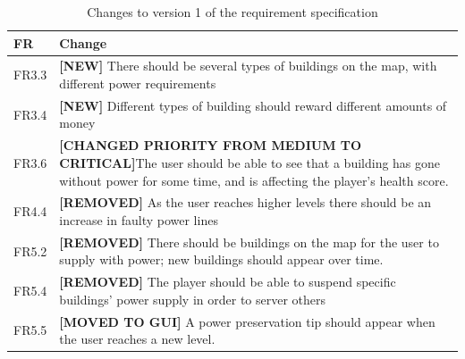 	\begin{table}[H]
	\begin{tabular}{| p{1.5cm} | p{12cm} |}
		\hline
		\rowcolor{lightgray}
		{\bf FR} & {\bf Change} \\ \hline
		FR3.3 & {\bf \color{green} [NEW]} There should be several types of buildings on the map, 
		with different power requirements  \\ \hline
		FR3.4 & {\bf \color{green} [NEW]} Different types of building should reward different amounts of 
		money \\ \hline
		FR3.6 & {\bf \color{orange} [CHANGED PRIORITY FROM MEDIUM TO CRITICAL]}The user should be able to see that a building has gone without power for some time, and is affecting the player's health score. \\ \hline
		FR4.4 & {\bf \color{red} [REMOVED]} As the user reaches higher levels there should be an 
		increase in faulty power lines \\ \hline
		FR5.2 & {\bf \color{red} [REMOVED]} There should be buildings on the map for the user to 
		supply with power; new buildings should appear over time. \\ \hline
		FR5.4 & {\bf \color{red} [REMOVED]} The player should be able to suspend specific buildings' 
		power supply in order to server others \\ \hline
		FR5.5 & {\bf \color{orange} [MOVED TO GUI]} A power preservation tip should appear when the 
		user reaches a new level. \\ \hline
	\end{tabular}
	\caption{Changes to version 1 of the requirement specification}
	\end{table}

